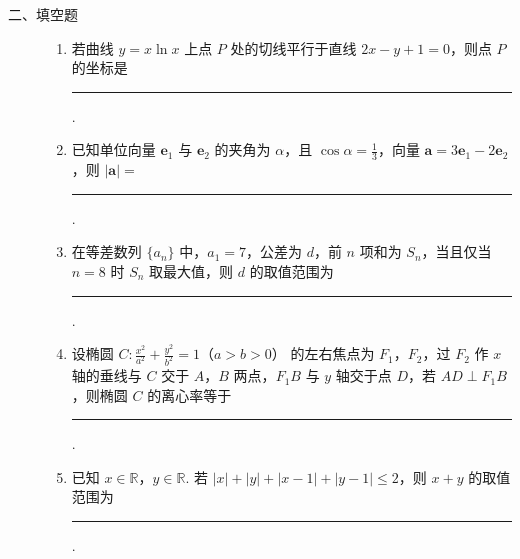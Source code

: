 \begin{description}

    \item[二、填空题]

    \begin{enumerate}[leftmargin=5pt]

      \addtocounter{enumi}{+10}

        \item 若曲线 \( y = x \ln x \) 上点 \(P\) 处的切线平行于直线 \( 2x - y + 1 = 0 \)，则点 \(P\) 的坐标是\rule[-0.3ex]{3em}{0.4pt}.

        \item 已知单位向量 \(\bm{e}_1\) 与 \(\bm{e}_2\) 的夹角为 \(\alpha\)，且 \(\cos \alpha = \frac{1}{3}\)，向量 \(\bm{a} = 3\bm{e}_1 - 2\bm{e}_2\)，则 \(|\bm{a}| = \)\rule[-0.3ex]{3em}{0.4pt}.

        \item 在等差数列 \(\{a_{n}\}\) 中，\(a_{1} = 7\)，公差为 \(d\)，前 \(n\) 项和为 \(S_{n}\)，当且仅当 \(n = 8\) 时 \(S_{n}\) 取最大值，则 \(d\) 的取值范围为\rule[-0.3ex]{3em}{0.4pt}.

        \item 设椭圆 \(C: \frac{x^2}{a^2} + \frac{y^2}{b^2} = 1\)（\(a > b > 0\)） 的左右焦点为 \(F_1\)，\(F_2\)，过 \(F_2\) 作 \(x\) 轴的垂线与 \(C\) 交于 \(A\)，\(B\) 两点，\(F_1B\) 与 \(y\) 轴交于点 \(D\)，若 \(AD \perp F_1B\)，则椭圆 \(C\) 的离心率等于\rule[-0.3ex]{3em}{0.4pt}.

        \item 已知 \(x\in\mathbb{R}\)，\(y\in\mathbb{R}\). 若 \(|x| + |y| + |x - 1| + |y - 1| \leqslant 2\)，则 \(x + y\) 的取值范围为\rule[-0.3ex]{3em}{0.4pt}.

    \end{enumerate}

\end{description}

